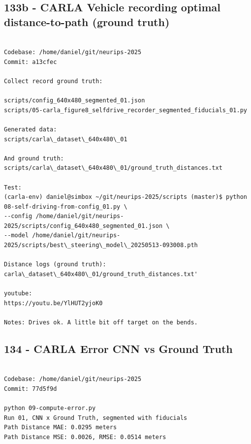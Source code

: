 \subsection{133b - CARLA Vehicle recording optimal distance-to-path (ground truth)}
\label{app_res:133b}

\begin{verbatim}

Codebase: /home/daniel/git/neurips-2025
Commit: a13cfec

Collect record ground truth:

scripts/config_640x480_segmented_01.json
scripts/05-carla_figure8_selfdrive_recorder_segmented_fiducials_01.py

Generated data:
scripts/carla\_dataset\_640x480\_01

And ground truth:
scripts/carla\_dataset\_640x480\_01/ground_truth_distances.txt

Test:
(carla-env) daniel@simbox ~/git/neurips-2025/scripts (master)$ python 08-self-driving-from-config_01.py \
--config /home/daniel/git/neurips-2025/scripts/config_640x480_segmented_01.json \
--model /home/daniel/git/neurips-2025/scripts/best\_steering\_model\_20250513-093008.pth

Distance logs (ground truth):
carla\_dataset\_640x480\_01/ground_truth_distances.txt'

youtube:
https://youtu.be/YlHUT2yjoK0

Notes: Drives ok. A little bit off target on the bends.

\end{verbatim}

\subsection{134 - CARLA Error CNN vs Ground Truth}
\label{app_res:134}

\begin{verbatim}

Codebase: /home/daniel/git/neurips-2025
Commit: 77d5f9d

python 09-compute-error.py 
Run 01, CNN x Ground Truth, segmented with fiducials
Path Distance MAE: 0.0295 meters
Path Distance MSE: 0.0026, RMSE: 0.0514 meters

\end{verbatim}

